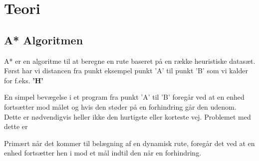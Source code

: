 \chapter{Teori}

\section{A* Algoritmen}

A* er en algoritme til at beregne en rute baseret på en række heuristiske datasæt. Først har vi distancen fra punkt eksempel punkt 'A' til punkt 'B' som vi kalder for f.eks. \textbf{'H'} 

En simpel bevægelse i et program fra punkt 'A' til 'B' foregår ved at en enhed fortsætter mod målet og hvis den støder på en forhindring går den udenom. Dette er nødvendigvis heller ikke den hurtigste eller korteste vej. Problemet med dette er 

Primært når det kommer til belægning af en dynamisk rute, foregår det ved at en enhed fortsætter hen i mod et mål indtil den når en forhindring. 
